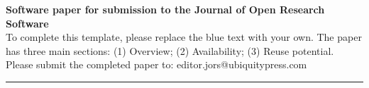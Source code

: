 {\bf Software paper for submission to the Journal of Open Research Software} \\

To complete this template, please replace the blue text with your own. The paper has three main sections: (1) Overview; (2)
Availability; (3) Reuse potential. \\

Please submit the completed paper to: editor.jors@ubiquitypress.com

\rule{\textwidth}{1pt}